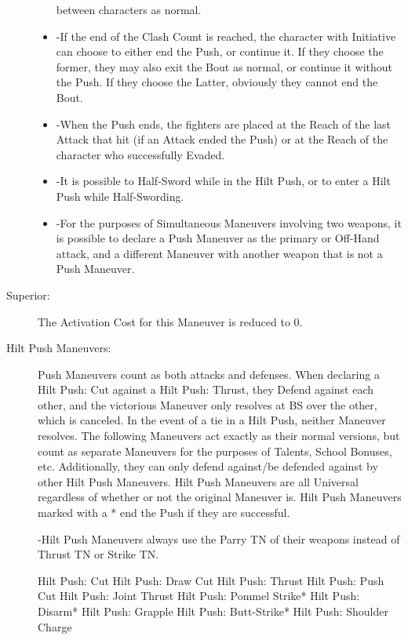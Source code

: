 \documentclass[oneside,11pt,english]{book}
\begin{document}
\begin{description}
\begin{itemize}
between characters as normal. 
		\item -If the end of the Clash Count is reached, the character with Initiative can choose to either end the Push, 
or continue it. If they choose the former, they may also exit the Bout as normal, or continue it without the 
Push. If they choose the Latter, obviously they cannot end the Bout.
		\item 
-When the Push ends, the fighters are placed at the Reach of the last Attack that hit (if an Attack ended 
the Push) or at the Reach of the character who successfully Evaded. 
		\item -It is possible to Half-Sword while in the Hilt Push, or to enter a Hilt Push while Half-Swording. 
		\item -For the purposes of Simultaneous Maneuvers involving two weapons, it is possible to declare a Push 
Maneuver as the primary or Off-Hand attack, and a different Maneuver with another weapon that is not a 
Push Maneuver.
	\end{itemize}
\item [Superior:] The Activation Cost for this Maneuver is reduced to 0. 
\item [Hilt Push Maneuvers:] Push Maneuvers count as both attacks and defenses. When declaring a Hilt Push: 
Cut against a Hilt Push: Thrust, they Defend against each other, and the victorious Maneuver only 
resolves at BS over the other, which is canceled. 
In the event of a tie in a Hilt Push, neither Maneuver resolves. 
The following Maneuvers act exactly as their normal versions, but count as separate Maneuvers for the 
purposes of Talents, School Bonuses, etc. Additionally, they can only defend against/be defended against 
by other Hilt Push Maneuvers. Hilt Push Maneuvers are all Universal regardless of whether or not the 
original Maneuver is. 
Hilt Push Maneuvers marked with a * end the Push if they are successful. 

-Hilt Push Maneuvers always use the Parry TN of their weapons instead of Thrust TN or Strike TN. 

Hilt Push: Cut 
Hilt Push: Draw Cut 
Hilt Push: Thrust 
Hilt Push: Push Cut 
Hilt Push: Joint Thrust 
Hilt Push: Pommel Strike* 
Hilt Push: Disarm* 
Hilt Push: Grapple 
Hilt Push: Butt-Strike* 
Hilt Push: Shoulder Charge 
\end{description}
\end{document}
